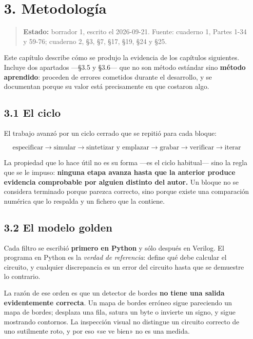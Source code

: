 \chapter{3. Metodología}\label{metodologuxeda}

\begin{quote}
\textbf{Estado:} borrador 1, escrito el 2026-09-21. Fuente: cuaderno 1,
Partes 1-34 y 59-76; cuaderno 2, §3, §7, §17, §19, §24 y §25.
\end{quote}

Este capítulo describe cómo se produjo la evidencia de los capítulos
siguientes. Incluye dos apartados ---§3.5 y §3.6--- que no son método
estándar sino \textbf{método aprendido}: proceden de errores cometidos
durante el desarrollo, y se documentan porque su valor está precisamente
en que costaron algo.

\section{3.1 El ciclo}\label{el-ciclo}

El trabajo avanzó por un ciclo cerrado que se repitió para cada bloque:

\[\text{especificar} \rightarrow \text{simular} \rightarrow \text{sintetizar y emplazar} \rightarrow \text{grabar} \rightarrow \text{verificar} \rightarrow \text{iterar}\]

La propiedad que lo hace útil no es su forma ---es el ciclo habitual---
sino la regla que se le impuso: \textbf{ninguna etapa avanza hasta que
la anterior produce evidencia comprobable por alguien distinto del
autor.} Un bloque no se considera terminado porque parezca correcto,
sino porque existe una comparación numérica que lo respalda y un fichero
que la contiene.

\section{3.2 El modelo golden}\label{el-modelo-golden}

Cada filtro se escribió \textbf{primero en Python} y sólo después en
Verilog. El programa en Python es la \emph{verdad de referencia}: define
qué debe calcular el circuito, y cualquier discrepancia es un error del
circuito hasta que se demuestre lo contrario.

La razón de ese orden es que un detector de bordes \textbf{no tiene una
salida evidentemente correcta}. Un mapa de bordes erróneo sigue
pareciendo un mapa de bordes; desplaza una fila, satura un byte o
invierte un signo, y sigue mostrando contornos. La inspección visual no
distingue un circuito correcto de uno sutilmente roto, y por eso «se ve
bien» no es una medida.

